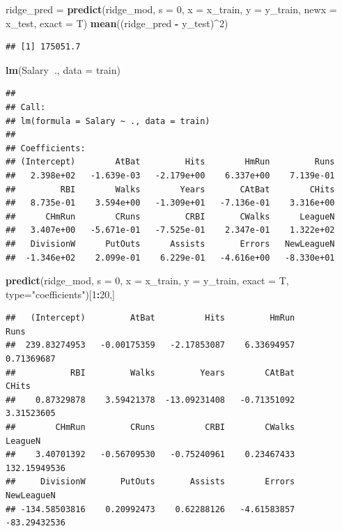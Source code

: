 \documentclass[openany]{book}
\newenvironment{Shaded}{\begin{snugshade}}{\end{snugshade}}
\newcommand{\DataTypeTok}[1]{\textcolor[rgb]{0.13,0.29,0.53}{#1}}
\newcommand{\DecValTok}[1]{\textcolor[rgb]{0.00,0.00,0.81}{#1}}
\newcommand{\KeywordTok}[1]{\textcolor[rgb]{0.13,0.29,0.53}{\textbf{#1}}}
\newcommand{\NormalTok}[1]{#1}
\newcommand{\OperatorTok}[1]{\textcolor[rgb]{0.81,0.36,0.00}{\textbf{#1}}}
\newcommand{\StringTok}[1]{\textcolor[rgb]{0.31,0.60,0.02}{#1}}
\begin{document}
\begin{Shaded}
\begin{Highlighting}[]
\NormalTok{ridge_pred =}\StringTok{ }\KeywordTok{predict}\NormalTok{(ridge_mod, }\DataTypeTok{s =} \DecValTok{0}\NormalTok{, }\DataTypeTok{x =}\NormalTok{ x_train, }\DataTypeTok{y =}\NormalTok{ y_train, }\DataTypeTok{newx =}\NormalTok{ x_test, }\DataTypeTok{exact =}\NormalTok{ T)}
\KeywordTok{mean}\NormalTok{((ridge_pred }\OperatorTok{-}\StringTok{ }\NormalTok{y_test)}\OperatorTok{^}\DecValTok{2}\NormalTok{)}
\end{Highlighting}
\end{Shaded}

\begin{verbatim}
## [1] 175051.7
\end{verbatim}

\begin{Shaded}
\begin{Highlighting}[]
\KeywordTok{lm}\NormalTok{(Salary}\OperatorTok{~}\NormalTok{., }\DataTypeTok{data =}\NormalTok{ train)}
\end{Highlighting}
\end{Shaded}

\begin{verbatim}
## 
## Call:
## lm(formula = Salary ~ ., data = train)
## 
## Coefficients:
## (Intercept)        AtBat         Hits        HmRun         Runs  
##   2.398e+02   -1.639e-03   -2.179e+00    6.337e+00    7.139e-01  
##         RBI        Walks        Years       CAtBat        CHits  
##   8.735e-01    3.594e+00   -1.309e+01   -7.136e-01    3.316e+00  
##      CHmRun        CRuns         CRBI       CWalks      LeagueN  
##   3.407e+00   -5.671e-01   -7.525e-01    2.347e-01    1.322e+02  
##   DivisionW      PutOuts      Assists       Errors   NewLeagueN  
##  -1.346e+02    2.099e-01    6.229e-01   -4.616e+00   -8.330e+01
\end{verbatim}

\begin{Shaded}
\begin{Highlighting}[]
\KeywordTok{predict}\NormalTok{(ridge_mod, }\DataTypeTok{s =} \DecValTok{0}\NormalTok{, }\DataTypeTok{x =}\NormalTok{ x_train, }\DataTypeTok{y =}\NormalTok{ y_train, }\DataTypeTok{exact =}\NormalTok{ T, }\DataTypeTok{type=}\StringTok{"coefficients"}\NormalTok{)[}\DecValTok{1}\OperatorTok{:}\DecValTok{20}\NormalTok{,]}
\end{Highlighting}
\end{Shaded}

\begin{verbatim}
##   (Intercept)         AtBat          Hits         HmRun          Runs 
##  239.83274953   -0.00175359   -2.17853087    6.33694957    0.71369687 
##           RBI         Walks         Years        CAtBat         CHits 
##    0.87329878    3.59421378  -13.09231408   -0.71351092    3.31523605 
##        CHmRun         CRuns          CRBI        CWalks       LeagueN 
##    3.40701392   -0.56709530   -0.75240961    0.23467433  132.15949536 
##     DivisionW       PutOuts       Assists        Errors    NewLeagueN 
## -134.58503816    0.20992473    0.62288126   -4.61583857  -83.29432536
\end{verbatim}
\end{document}
